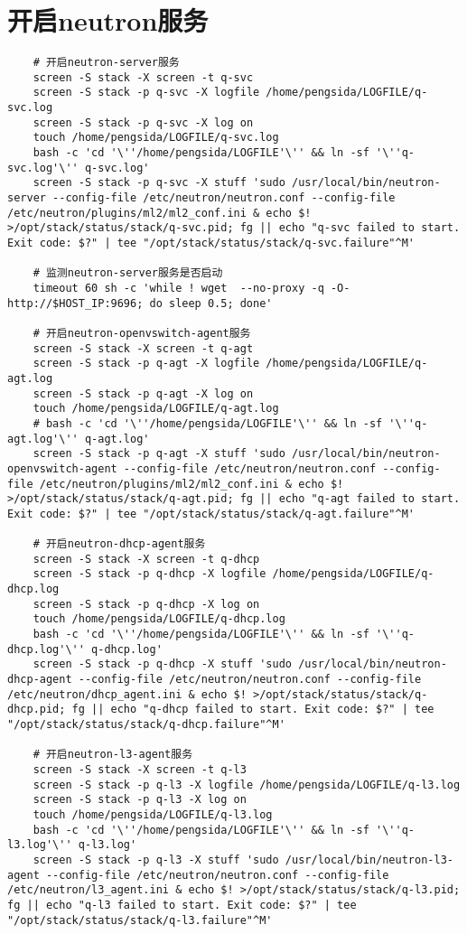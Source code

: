 \documentclass[a4paper,left=1.5cm,right=1.5cm,11pt]{article}
\begin{document}
\section{开启neutron服务}
	\begin{lstlisting}
	# 开启neutron-server服务
	screen -S stack -X screen -t q-svc
	screen -S stack -p q-svc -X logfile /home/pengsida/LOGFILE/q-svc.log
    screen -S stack -p q-svc -X log on
	touch /home/pengsida/LOGFILE/q-svc.log
    bash -c 'cd '\''/home/pengsida/LOGFILE'\'' && ln -sf '\''q-svc.log'\'' q-svc.log'
	screen -S stack -p q-svc -X stuff 'sudo /usr/local/bin/neutron-server --config-file /etc/neutron/neutron.conf --config-file /etc/neutron/plugins/ml2/ml2_conf.ini & echo $! >/opt/stack/status/stack/q-svc.pid; fg || echo "q-svc failed to start. Exit code: $?" | tee "/opt/stack/status/stack/q-svc.failure"^M'

	# 监测neutron-server服务是否启动
	timeout 60 sh -c 'while ! wget  --no-proxy -q -O- http://$HOST_IP:9696; do sleep 0.5; done'

	# 开启neutron-openvswitch-agent服务
	screen -S stack -X screen -t q-agt
	screen -S stack -p q-agt -X logfile /home/pengsida/LOGFILE/q-agt.log
    screen -S stack -p q-agt -X log on
	touch /home/pengsida/LOGFILE/q-agt.log
    # bash -c 'cd '\''/home/pengsida/LOGFILE'\'' && ln -sf '\''q-agt.log'\'' q-agt.log'
	screen -S stack -p q-agt -X stuff 'sudo /usr/local/bin/neutron-openvswitch-agent --config-file /etc/neutron/neutron.conf --config-file /etc/neutron/plugins/ml2/ml2_conf.ini & echo $! >/opt/stack/status/stack/q-agt.pid; fg || echo "q-agt failed to start. Exit code: $?" | tee "/opt/stack/status/stack/q-agt.failure"^M'

	# 开启neutron-dhcp-agent服务
	screen -S stack -X screen -t q-dhcp
	screen -S stack -p q-dhcp -X logfile /home/pengsida/LOGFILE/q-dhcp.log
    screen -S stack -p q-dhcp -X log on
	touch /home/pengsida/LOGFILE/q-dhcp.log
    bash -c 'cd '\''/home/pengsida/LOGFILE'\'' && ln -sf '\''q-dhcp.log'\'' q-dhcp.log'
	screen -S stack -p q-dhcp -X stuff 'sudo /usr/local/bin/neutron-dhcp-agent --config-file /etc/neutron/neutron.conf --config-file /etc/neutron/dhcp_agent.ini & echo $! >/opt/stack/status/stack/q-dhcp.pid; fg || echo "q-dhcp failed to start. Exit code: $?" | tee "/opt/stack/status/stack/q-dhcp.failure"^M'

	# 开启neutron-l3-agent服务
	screen -S stack -X screen -t q-l3
	screen -S stack -p q-l3 -X logfile /home/pengsida/LOGFILE/q-l3.log
    screen -S stack -p q-l3 -X log on
	touch /home/pengsida/LOGFILE/q-l3.log
    bash -c 'cd '\''/home/pengsida/LOGFILE'\'' && ln -sf '\''q-l3.log'\'' q-l3.log'
	screen -S stack -p q-l3 -X stuff 'sudo /usr/local/bin/neutron-l3-agent --config-file /etc/neutron/neutron.conf --config-file /etc/neutron/l3_agent.ini & echo $! >/opt/stack/status/stack/q-l3.pid; fg || echo "q-l3 failed to start. Exit code: $?" | tee "/opt/stack/status/stack/q-l3.failure"^M'


\end{lstlisting}
\end{document}
